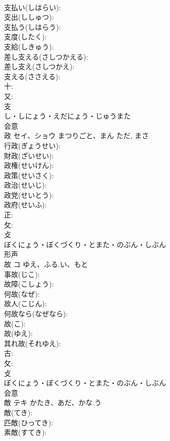 \documentclass[8pt]{extreport}
\begin{document}
\begin{CJK}{UTF8}{min}
\\	支払い(しはらい): 
\\	支出(ししゅつ): 
\\	支払う(しはらう): 
\\	支度(したく): 
\\	支給(しきゅう): 
\\	差し支える(さしつかえる): 
\\	差し支え(さしつかえ): 
\\	支える(ささえる): 
\\	十: 
\\	又: 
\\	支	
\\	し・しにょう・えだにょう・じゅうまた	
\\	会意 
\\	政	セイ、ショウ	まつりごと、まん	ただ, まさ	
\\	行政(ぎょうせい): 
\\	財政(ざいせい): 
\\	政権(せいけん): 
\\	政策(せいさく): 
\\	政治(せいじ): 
\\	政党(せいとう): 
\\	政府(せいふ): 
\\	正: 
\\	攵: 
\\	攴	
\\	ぼくにょう・ぼくづくり・とまた・のぶん・しぶん	
\\	形声 
\\	故	コ	ゆえ、ふる.い、もと		
\\	事故(じこ): 
\\	故障(こしょう): 
\\	何故(なぜ): 
\\	故人(こじん): 
\\	何故なら(なぜなら): 
\\	故(こ): 
\\	故(ゆえ): 
\\	其れ故(それゆえ): 
\\	古: 
\\	攵: 
\\	攴	
\\	ぼくにょう・ぼくづくり・とまた・のぶん・しぶん	
\\	会意 
\\	敵	テキ	かたき、あだ、かな.う		
\\	敵(てき): 
\\	匹敵(ひってき): 
\\	素敵(すてき): 

\end{CJK}
\end{document}

